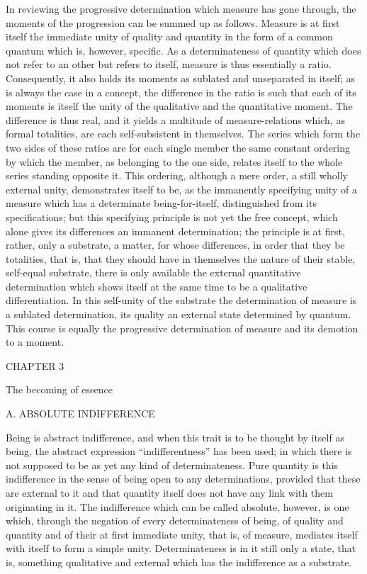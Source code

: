 In reviewing the progressive determination
which measure has gone through,
the moments of the progression can be summed up as follows.
Measure is at first itself
the immediate unity of quality and quantity
in the form of a common quantum
which is, however, specific.
As a determinateness of quantity
which does not refer to an other but refers to itself,
measure is thus essentially a ratio.
Consequently, it also holds its moments
as sublated and unseparated in itself;
as is always the case in a concept,
the difference in the ratio is such
that each of its moments is itself the unity of
the qualitative and the quantitative moment.
The difference is thus real,
and it yields a multitude of measure-relations
which, as formal totalities,
are each self-subsistent in themselves.
The series which form the two sides of these ratios
are for each single member the same constant ordering
by which the member, as belonging to the one side,
relates itself to the whole series standing opposite it.
This ordering, although a mere order,
a still wholly external unity,
demonstrates itself to be,
as the immanently specifying unity of a measure
which has a determinate being-for-itself,
distinguished from its specifications;
but this specifying principle is not yet the free concept,
which alone gives its differences an immanent determination;
the principle is at first, rather, only a substrate,
a matter, for whose differences, in order that they be totalities,
that is, that they should have in themselves the nature
of their stable, self-equal substrate,
there is only available the external quantitative determination
which shows itself at the same time to be a qualitative differentiation.
In this self-unity of the substrate
the determination of measure is a sublated determination,
its quality an external state determined by quantum.
This course is equally the progressive determination
of measure and its demotion to a moment.

CHAPTER 3

The becoming of essence

A. ABSOLUTE INDIFFERENCE

Being is abstract indifference,
and when this trait is to be thought by itself as being,
the abstract expression “indifferentness” has been used;
in which there is not supposed to be as yet
any kind of determinateness.
Pure quantity is this indifference in the sense of
being open to any determinations,
provided that these are external to it
and that quantity itself does not have
any link with them originating in it.
The indifference which can be called absolute,
however, is one which, through the negation of
every determinateness of being, of quality and quantity
and of their at first immediate unity, that is, of measure,
mediates itself with itself to form a simple unity.
Determinateness is in it still only a state, that is,
something qualitative and external
which has the indifference as a substrate.

